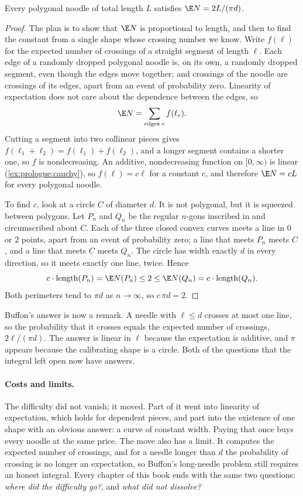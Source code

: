 \begin{refsection}
\begin{theorem*}[Barbier]
Every polygonal noodle of total length $L$ satisfies $\E N = 2L/(\pi d)$.
\end{theorem*}

\begin{proof}
The plan is to show that $\E N$ is proportional to length, and then to find the constant from a single shape whose crossing number we know. Write $f(\ell)$ for the expected number of crossings of a straight segment of length $\ell$. Each edge of a randomly dropped polygonal noodle is, on its own, a randomly dropped segment, even though the edges move together; and crossings of the noodle are crossings of its edges, apart from an event of probability zero. Linearity of expectation does not care about the dependence between the edges, so
\[
  \E N = \sum_{\text{edges } e} f(\ell_e).
\]
Cutting a segment into two collinear pieces gives $f(\ell_1+\ell_2) = f(\ell_1)+f(\ell_2)$, and a longer segment contains a shorter one, so $f$ is nondecreasing. An additive, nondecreasing function on $[0,\infty)$ is linear (\cref{ex:prologue:cauchy}), so $f(\ell) = c\ell$ for a constant $c$, and therefore $\E N = cL$ for every polygonal noodle.

To find $c$, look at a circle $C$ of diameter $d$. It is not polygonal, but it is squeezed between polygons. Let $P_n$ and $Q_n$ be the regular $n$-gons inscribed in and circumscribed about $C$. Each of the three closed convex curves meets a line in $0$ or $2$ points, apart from an event of probability zero; a line that meets $P_n$ meets $C$, and a line that meets $C$ meets $Q_n$. The circle has width exactly $d$ in every direction, so it meets exactly one line, twice. Hence
\[
  c\cdot\operatorname{length}(P_n) = \E N(P_n) \le 2 \le \E N(Q_n) = c\cdot\operatorname{length}(Q_n).
\]
Both perimeters tend to $\pi d$ as $n\to\infty$, so $c\,\pi d = 2$.
\end{proof}

Buffon's answer is now a remark. A needle with $\ell\le d$ crosses at most one line, so the probability that it crosses equals the expected number of crossings, $2\ell/(\pi d)$. The answer is linear in $\ell$ because the expectation is additive, and $\pi$ appears because the calibrating shape is a circle. Both of the questions that the integral left open now have answers.

\paragraph{Costs and limits.} The difficulty did not vanish; it moved. Part of it went into linearity of expectation, which holds for dependent pieces, and part into the existence of one shape with an obvious answer: a curve of constant width. Paying that once buys every noodle at the same price. The move also has a limit. It computes the expected number of crossings, and for a needle longer than $d$ the probability of crossing is no longer an expectation, so Buffon's long-needle problem still requires an honest integral. Every chapter of this book ends with the same two questions: \emph{where did the difficulty go?}, and \emph{what did not dissolve?}


\end{refsection}
